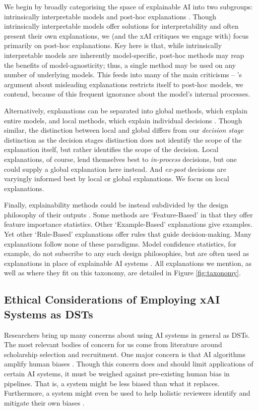 We begin by broadly categorising the space of explainable AI into two subgroups: intrinsically interpretable models and post-hoc explanations \cite{molnar_interpretable_2019}. Though intrinsically interpretable models offer solutions for interpretability and often present their own explanations, we (and the xAI critiques we engage with) focus primarily on post-hoc explanations. Key here is that, while intrinsically interpretable models are inherently model-specific, post-hoc methods may reap the benefits of model-agnosticity; thus, a single method may be used on any number of underlying models. This feeds into many of the main criticisms – \textcite{Lipton}'s argument about misleading explanations restricts itself to post-hoc models, we contend, because of this frequent ignorance about the model's internal processes.

Alternatively, explanations can be separated into global methods, which explain entire models, and local methods, which explain individual decisions \cite{molnar_interpretable_2019}. Though similar, the distinction between local and global differs from our \emph{decision stage} distinction as the decision stages distinction does not identify the scope of the explanation itself, but rather identifies the scope of the decision. Local explanations, of course, lend themselves best to \emph{in-process} decisions, but one could supply a global explanation here instead. And \emph{ex-post} decisions are varyingly informed best by local or global explanations. We focus on local explanations.

Finally, explainability methods could be instead subdivided by the design philosophy of their outputs \cite{friedrich_taxonomy_2011}. Some methods are `Feature-Based' in that they offer feature importance statistics. Other `Example-Based' explanations give examples. Yet other `Rule-Based' explanations offer rules that guide decision-making. Many explanations follow none of these paradigms. Model confidence statistics, for example, do not subscribe to any such design philosophies, but are often used as explanations in place of explainable AI systems \cite{zhang_effect_2020}. All explanations we mention, as well as where they fit on this taxonomy, are detailed in Figure \ref{fig:taxonomy}.

\subsection{Ethical Considerations of Employing xAI Systems as DSTs}
Researchers bring up many concerns about using AI systems in general as DSTs. The most relevant bodies of concern for us come from literature around scholarship selection and recruitment. One major concern is that AI algorithms amplify human biases \cite{MikePerkins_JasperRoe_2023}. Though this concern does and should limit applications of certain AI systems, it must be weighed against pre-existing human bias in pipelines. That is, a system might be less biased than what it replaces. Furthermore, a system might even be used to help holistic reviewers identify and mitigate their own biases \cite{alvero_ai_2020}.

